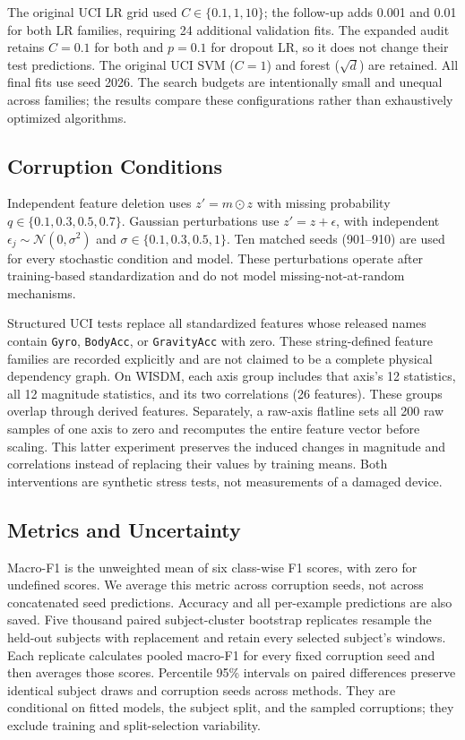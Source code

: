 \documentclass[conference]{IEEEtran}
\begin{document}
The original UCI LR grid used $C\in\{0.1,1,10\}$; the follow-up adds 0.001 and 0.01 for both LR families, requiring 24 additional validation fits. The expanded audit retains $C=0.1$ for both and $p=0.1$ for dropout LR, so it does not change their test predictions. The original UCI SVM ($C=1$) and forest ($\sqrt d$) are retained. All final fits use seed 2026. The search budgets are intentionally small and unequal across families; the results compare these configurations rather than exhaustively optimized algorithms.

\subsection{Corruption Conditions}
Independent feature deletion uses $z'=m\odot z$ with missing probability $q\in\{0.1,0.3,0.5,0.7\}$. Gaussian perturbations use $z'=z+\epsilon$, with independent $\epsilon_j\sim\mathcal N(0,\sigma^2)$ and $\sigma\in\{0.1,0.3,0.5,1\}$. Ten matched seeds (901--910) are used for every stochastic condition and model. These perturbations operate after training-based standardization and do not model missing-not-at-random mechanisms.

Structured UCI tests replace all standardized features whose released names contain \texttt{Gyro}, \texttt{BodyAcc}, or \texttt{GravityAcc} with zero. These string-defined feature families are recorded explicitly and are not claimed to be a complete physical dependency graph. On WISDM, each axis group includes that axis's 12 statistics, all 12 magnitude statistics, and its two correlations (26 features). These groups overlap through derived features. Separately, a raw-axis flatline sets all 200 raw samples of one axis to zero and recomputes the entire feature vector before scaling. This latter experiment preserves the induced changes in magnitude and correlations instead of replacing their values by training means. Both interventions are synthetic stress tests, not measurements of a damaged device.

\subsection{Metrics and Uncertainty}
Macro-F1 is the unweighted mean of six class-wise F1 scores, with zero for undefined scores. We average this metric across corruption seeds, not across concatenated seed predictions. Accuracy and all per-example predictions are also saved. Five thousand paired subject-cluster bootstrap replicates resample the held-out subjects with replacement and retain every selected subject's windows. Each replicate calculates pooled macro-F1 for every fixed corruption seed and then averages those scores. Percentile 95\% intervals on paired differences preserve identical subject draws and corruption seeds across methods. They are conditional on fitted models, the subject split, and the sampled corruptions; they exclude training and split-selection variability.
\end{document}

